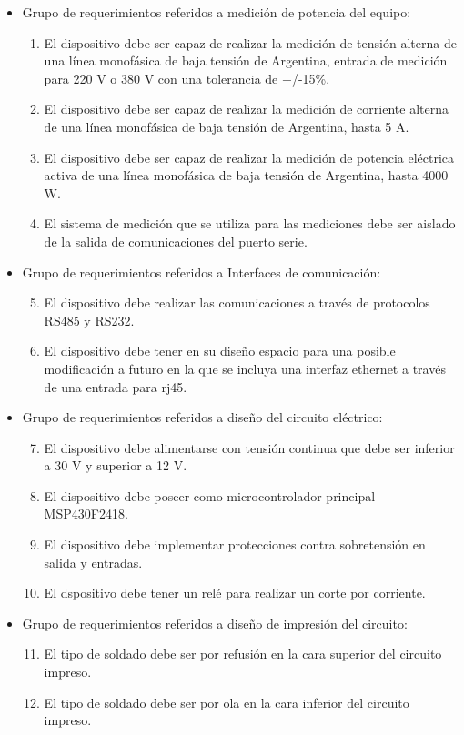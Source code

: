 \begin{itemize}
\item Grupo de requerimientos referidos a medición de potencia del equipo:
\begin{enumerate}
\item El dispositivo debe ser capaz de realizar la medición de tensión alterna de una línea monofásica de baja tensión de Argentina, entrada de medición para 220 V o 380 V con una tolerancia de +/-15\%.
\item El dispositivo debe ser capaz de realizar la medición de corriente alterna de una línea monofásica de baja tensión de Argentina, hasta 5 A.
\item El dispositivo debe ser capaz de realizar la medición de potencia eléctrica activa de una línea monofásica de baja tensión de Argentina, hasta 4000 W.
\item El sistema de medición que se utiliza para las mediciones debe ser aislado de la salida de comunicaciones del puerto serie.
\end{enumerate}

\item Grupo de requerimientos referidos a Interfaces de comunicación:
\begin{enumerate}
\setcounter{enumi}{4}
\item El dispositivo debe realizar las comunicaciones a través de protocolos RS485 y RS232.
\item El dispositivo debe tener en su diseño espacio para una posible modificación a futuro en la que se incluya una interfaz ethernet a través de una entrada para rj45.
\end{enumerate}

\item Grupo de requerimientos referidos a diseño del circuito eléctrico:
\begin{enumerate}
\setcounter{enumi}{6}
\item El dispositivo debe alimentarse con tensión continua que debe ser inferior a 30 V y superior a 12 V.
\item El dispositivo debe poseer como microcontrolador principal MSP430F2418.
\item El dispositivo debe implementar protecciones contra sobretensión en salida y entradas.
\item El dspositivo debe tener un relé para realizar un corte por corriente.
\end{enumerate}

\item Grupo de requerimientos referidos a diseño  de impresión del circuito:
\begin{enumerate}
\setcounter{enumi}{10}
\item El tipo de soldado debe ser por refusión en la cara superior del circuito impreso.

\item El tipo de soldado debe ser por ola en la cara inferior del circuito impreso.
\end{enumerate}
\end{itemize}




